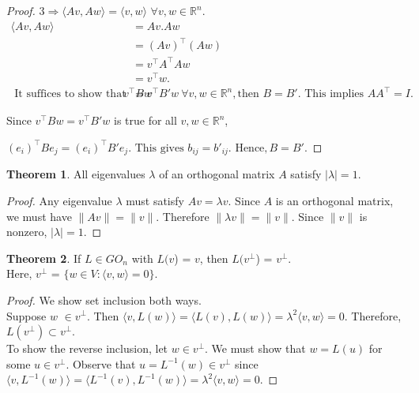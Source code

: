 \documentclass[11pt]{report}
\theoremstyle{plain}
\theoremstyle{definition}
\newtheorem{theorem}{Theorem}
\newcommand\inner[2]{\langle #1, #2 \rangle}
\begin{document}
\begin{proof}
$3 \Longrightarrow  \inner{Av}{Aw} = \inner{v}{w}$ \: $\forall v,w \in \mathbb{R}^n$.
\begin{align*}
\inner{Av}{Aw} &= Av.Aw\\ 
&= (Av)^\intercal (Aw)\\
&= v^\intercal A^\intercal A w\\
&= v^\intercal  w.\\ 
\text{ It suffices to show that if } v^\intercal B w &= v^\intercal B' w \: \forall v, w \in \mathbb{R}^n, \text{then } B = B'. \text{ This implies }AA^\intercal = I.	
\end{align*}

Since $ v^\intercal B w = v^\intercal B' w $ is true for all $ v, w \in \mathbb{R}^n $,

$ (e_i)^\intercal B e_j = (e_i)^\intercal B' e_j. \text{ This gives } b_{ij} = b'_{ij}. \text{ Hence}, B = B'.
 $


\end{proof}
\begin{theorem}
	All eigenvalues $ \lambda $ of an orthogonal matrix $ A $ satisfy $ |\lambda| = 1. $ 
\end{theorem}
\begin{proof}
	Any eigenvalue $ \lambda $ must satisfy $ Av = \lambda v. $ Since $ A $ is an orthogonal matrix, we must have $ \|Av\| = \|v\|. $ Therefore $ \|\lambda v \| = \|v\| $. Since $ \|v\|$ is nonzero,  $ |\lambda| = 1. $
\end{proof}
\begin{theorem}
	If $ L  \in  GO_n $ with $L( v $) = $ v $, then $L(v^\bot$) = $v^\bot$.\\
	Here, $v^\bot$ = $\{w \in V : \inner{v}{w} = 0\}.  $ 
\end{theorem}
\begin{proof}
	We show set inclusion both ways.\\
	Suppose $ w $ $ \in v^\bot $. Then $ \inner{v}{L(w)}= \inner{L(v)}{L(w)}=\lambda^2\inner{v}{w} = 0 $. Therefore, $ L(v^\bot)\subset v^\bot.$ \\To show the reverse inclusion, let $ w \in v^\bot $. We must show that $ w = L(u)$ for some  $u \in v^\bot .$ Observe that $ u = L^{-1}(w) \in v^\bot $ since $ \inner{v}{L^{-1}(w)} = \inner{L^{-1}(v)}{L^{-1}(w)} = \lambda^2\inner{v}{w} = 0. $
\end{proof}
\end{document}
